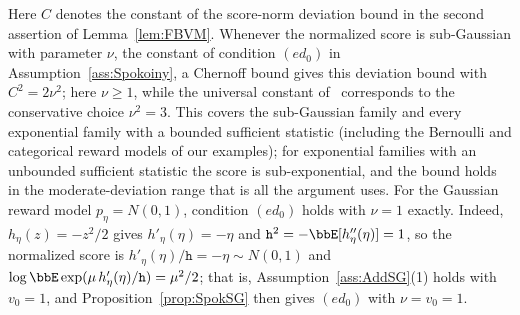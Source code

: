\documentclass[11pt]{article}
\begin{document}
Here $C$ denotes the constant of the score-norm deviation bound in the second assertion of Lemma~\ref{lem:FBVM}. Whenever the normalized score is sub-Gaussian with parameter $\nu$, the constant of condition $(e\!d_0)$ in Assumption~\ref{ass:Spokoiny}, a Chernoff bound gives this deviation bound with $C^2 = 2\nu^2$; here $\nu \geq 1$, while the universal constant of~\citet{Panov2015} corresponds to the conservative choice $\nu^2 = 3$. This covers the sub-Gaussian family and every exponential family with a bounded sufficient statistic (including the Bernoulli and categorical reward models of our examples); for exponential families with an unbounded sufficient statistic the score is sub-exponential, and the bound holds in the moderate-deviation range that is all the argument uses. For the Gaussian reward model $p_\eta = N(0,1)$, condition $(e\!d_0)$ holds with $\nu = 1$ exactly. Indeed, $h_\eta(z) = -z^2/2$ gives $h'_\eta(\eta) = -\eta$ and $\mathtt{h}^2 = -\bbE[h''_\eta(\eta)] = 1$, so the normalized score is $h'_\eta(\eta)/\mathtt{h} = -\eta \sim N(0,1)$ and $\log \bbE \exp(\mu\, h'_\eta(\eta)/\mathtt{h}) = \mu^2/2$; that is, Assumption~\ref{ass:AddSG}(1) holds with $v_0 = 1$, and Proposition~\ref{prop:SpokSG} then gives $(e\!d_0)$ with $\nu = v_0 = 1$. %
\end{document}
